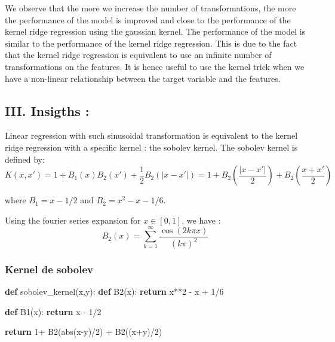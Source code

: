 \documentclass[
  letterpaper,
  DIV=11,
  numbers=noendperiod]{scrartcl}
\newenvironment{Shaded}{\begin{snugshade}}{\end{snugshade}}
\newcommand{\BuiltInTok}[1]{\textcolor[rgb]{0.00,0.23,0.31}{#1}}
\newcommand{\ControlFlowTok}[1]{\textcolor[rgb]{0.00,0.23,0.31}{\textbf{#1}}}
\newcommand{\DecValTok}[1]{\textcolor[rgb]{0.68,0.00,0.00}{#1}}
\newcommand{\KeywordTok}[1]{\textcolor[rgb]{0.00,0.23,0.31}{\textbf{#1}}}
\newcommand{\NormalTok}[1]{\textcolor[rgb]{0.00,0.23,0.31}{#1}}
\newcommand{\OperatorTok}[1]{\textcolor[rgb]{0.37,0.37,0.37}{#1}}
\begin{document}
We observe that the more we increase the number of transformations, the
more the performance of the model is improved and close to the
performance of the kernel ridge regression using the gaussian kernel.
The performance of the model is similar to the performance of the kernel
ridge regression. This is due to the fact that the kernel ridge
regression is equivalent to use an infinite number of transformations on
the features. It is hence useful to use the kernel trick when we have a
non-linear relationship between the target variable and the features.

\subsection{III. Insigths :}\label{iii.-insigths}

Linear regression with such sinusoidal transformation is equivalent to
the kernel ridge regression with a specific kernel : the sobolev kernel.
The sobolev kernel is defined by: \[
K(x, x') = 1 + B_1(x)B_2(x') + \frac{1}{2}B_2(|x-x'|) = 1 + B_2(\frac{|x-x'|}{2}) + B_2(\frac{x+x'}{2})
\]

where \(B_1 = x - 1/2\) and \(B_2 = x^2 - x - 1/6\).

Using the fourier series expansion for \(x \in [0,1]\), we have : \[
B_2(x) = \sum_{k=1}^{\infty} \frac{\cos(2k\pi x)}{(k\pi)^2}
\]

\subsubsection{Kernel de sobolev}\label{kernel-de-sobolev}

\begin{Shaded}
\begin{Highlighting}[]
\KeywordTok{def}\NormalTok{ sobolev\_kernel(x,y):}
    \KeywordTok{def}\NormalTok{ B2(x):}
        \ControlFlowTok{return}\NormalTok{ x}\OperatorTok{**}\DecValTok{2} \OperatorTok{{-}}\NormalTok{ x }\OperatorTok{+} \DecValTok{1}\OperatorTok{/}\DecValTok{6}
    
    \KeywordTok{def}\NormalTok{ B1(x):}
        \ControlFlowTok{return}\NormalTok{ x }\OperatorTok{{-}} \DecValTok{1}\OperatorTok{/}\DecValTok{2}
    
    \ControlFlowTok{return} \DecValTok{1}\OperatorTok{+}\NormalTok{ B2(}\BuiltInTok{abs}\NormalTok{(x}\OperatorTok{{-}}\NormalTok{y)}\OperatorTok{/}\DecValTok{2}\NormalTok{) }\OperatorTok{+}\NormalTok{ B2((x}\OperatorTok{+}\NormalTok{y)}\OperatorTok{/}\DecValTok{2}\NormalTok{)}
\end{Highlighting}
\end{Shaded}
\end{document}
